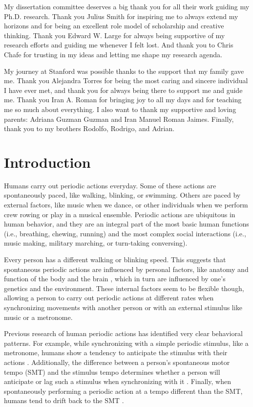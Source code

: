 \documentclass{report}
\begin{document}
My dissertation committee deserves a big thank you for all their work guiding my Ph.D. research. Thank you Julius Smith for inspiring me to always extend my horizons and for being an excellent role model of scholarship and creative thinking. Thank you Edward W. Large for always being supportive of my research efforts and guiding me whenever I felt lost. And thank you to Chris Chafe for trusting in my ideas and letting me shape my research agenda. 

My journey at Stanford was possible thanks to the support that my family gave me. Thank you Alejandra Torres for being the most caring and sincere individual I have ever met, and thank you for always being there to support me and guide me. Thank you Iran A. Roman for bringing joy to all my days and for teaching me so much about everything. I also want to thank my supportive and loving parents: Adriana Guzman Guzman and Iran Manuel Roman Jaimes. Finally, thank you to my brothers Rodolfo, Rodrigo, and Adrian.

\afterpreface

\chapter{Introduction}

Humans carry out periodic actions everyday. Some of these actions are spontaneously paced, like walking, blinking, or swimming. Others are paced by external factors, like music when we dance, or other individuals when we perform crew rowing or play in a musical ensemble. Periodic actions are ubiquitous in human behavior, and they are an integral part of the most basic human functions (i.e., breathing, chewing, running) and the most complex social interactions (i.e., music making, military marching, or turn-taking conversing).

Every person has a different walking or blinking speed. This suggests that spontaneous periodic actions are influenced by personal factors, like anatomy and function of the body \cite{goodman2000advantages} and the brain \cite{latash1992virtual}, which in turn are influenced by one's genetics and the environment. These internal factors seem to be flexible though, allowing a person to carry out periodic actions at different rates when synchronizing movements with another person or with an external stimulus like music or a metronome. 

Previous research of human periodic actions has identified very clear behavioral patterns. For example, while synchronizing with a simple periodic stimulus, like a metronome, humans show a tendency to anticipate the stimulus with their actions \cite{repp2007tapping}. Additionally, the difference between a person's spontaneous motor tempo (SMT) and the stimulus tempo determines whether a person will anticipate or lag such a stimulus when synchronizing with it \cite{scheurich2018tapping}. Finally, when spontaneously performing a periodic action at a tempo different than the SMT, humans tend to drift back to the SMT \cite{zamm2018musicians}. 
\end{document}
